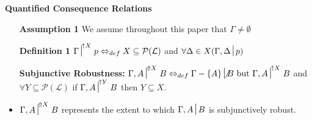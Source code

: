 \documentclass{article}
\newcommand{\nc}{\turnstile{s}{w}{}{}{n}}
\begin{document}
\noindent\textbf{Quantified Consequence Relations}
\begin{itemize}
\item [\textbf{Assumption 1}] We assume throughout this paper that $ \Gamma \neq \emptyset $
\item[\textbf{Definition 1}] $\Gamma\nc^{\uparrow X} p \Leftrightarrow_{def}  X\subseteq\mathcal{P}(\mathcal{L}) $ and $ \forall\Delta\in X(\Gamma, \Delta \nc p )$




\vspace{1cm}

\item[\textbf{Subjunctive Robustness:}] $\Gamma, A\nc^{\Uparrow X} B \Leftrightarrow_{def}  \Gamma-\{A\}\not\nc B \text{\,\,but\,\,}\Gamma, A \nc^{\uparrow X} B $ and $ \forall Y \subseteq\mathcal{P}(\mathcal{L}) $ if $ \Gamma, A \nc^{\uparrow Y}B$ then $ Y \subseteq X$.

\item $ \Gamma, A\nc^{\Uparrow X} B $ represents the extent to which $ \Gamma, A \nc B $  is subjunctively robust.



 
 \color{black}



\end{itemize}
\end{document}
